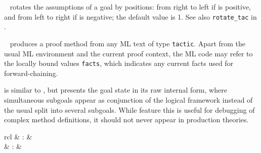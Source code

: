 \begin{isabellebody}
\begin{isamarkuptext}
\begin{description}
  \item \hyperlink{method.rotate-tac}{\mbox{}}~ rotates the assumptions of a
  goal by  positions: from right to left if  is
  positive, and from left to right if  is negative; the
  default value is 1.  See also \verb|rotate_tac| in
  \cite{isabelle-implementation}.

  \item \hyperlink{method.tactic}{\mbox{}}~ produces a proof method from
  any ML text of type \verb|tactic|.  Apart from the usual ML
  environment and the current proof context, the ML code may refer to
  the locally bound values \verb|facts|, which indicates any
  current facts used for forward-chaining.

  \item \hyperlink{method.raw-tactic}{\mbox{}} is similar to \hyperlink{method.tactic}{\mbox{}}, but
  presents the goal state in its raw internal form, where simultaneous
  subgoals appear as conjunction of the logical framework instead of
  the usual split into several subgoals.  While feature this is useful
  for debugging of complex method definitions, it should not never
  appear in production theories.

  \end{description}%
\end{isamarkuptext}%
\isamarkuptrue%
%
\isamarkuptrue%
%
\isamarkuptrue%
%
\begin{isamarkuptext}%
\begin{matharray}{rcl}
    \hypertarget{method.simp}{\hyperlink{method.simp}{\mbox{}}} & : &  \\
    \hypertarget{method.simp-all}{\hyperlink{method.simp-all}{\mbox{}}} & : &  \\
  \end{matharray}


\end{isamarkuptext}
\end{isabellebody}
